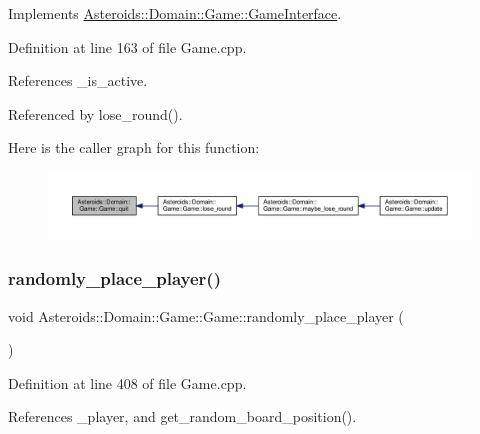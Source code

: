 Implements \hyperlink{classAsteroids_1_1Domain_1_1Game_1_1GameInterface_a045096acf97a53c3827be8bd2795ec35}{Asteroids\+::\+Domain\+::\+Game\+::\+Game\+Interface}.



Definition at line 163 of file Game.\+cpp.



References \+\_\+is\+\_\+active.



Referenced by lose\+\_\+round().

Here is the caller graph for this function\+:\nopagebreak
\begin{figure}[H]
\begin{center}
\leavevmode
\includegraphics[width=350pt]{classAsteroids_1_1Domain_1_1Game_1_1Game_a7e1bbc8f577a798f57d736bdc51fd149_icgraph}
\end{center}
\end{figure}
\mbox{\label{classAsteroids_1_1Domain_1_1Game_1_1Game_a5de32d7dcb5350720e625be3d40cee54}} 
\subsubsection{\texorpdfstring{randomly\+\_\+place\+\_\+player()}{randomly\_place\_player()}}
{\footnotesize\ttfamily void Asteroids\+::\+Domain\+::\+Game\+::\+Game\+::randomly\+\_\+place\+\_\+player (\begin{DoxyParamCaption}{ }\end{DoxyParamCaption})\hspace{0.3cm}{\ttfamily [private]}}



Definition at line 408 of file Game.\+cpp.



References \+\_\+player, and get\+\_\+random\+\_\+board\+\_\+position().




